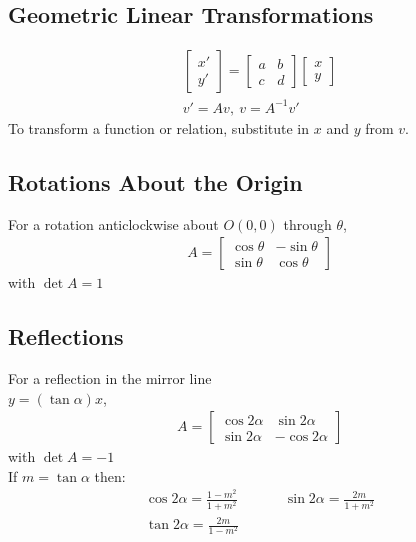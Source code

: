 \documentclass[10pt, a4paper, titlepage]{article}
\begin{document}
\begin{multicols*}{3}
\subsection{Geometric Linear Transformations}
\begin{gather}
	\begin{bmatrix}
		x'\\
		y'
	\end{bmatrix}
	=
	\begin{bmatrix}
		a & b\\
		c & d
	\end{bmatrix}
	\begin{bmatrix}
		x\\
		y
	\end{bmatrix}\\
	v'=Av,\ v=A^{-1}v'
\end{gather}
To transform a function or relation, substitute in $x$ and $y$ from $v$.\\

\dotfill
\subsection{Rotations About the Origin}
For a rotation anticlockwise about $O(0,0)$ through $\theta$,
\begin{align}
	A=
	\begin{bmatrix}
		\cos{\theta} & -\sin{\theta}\\
		\sin{\theta} & \cos{\theta}
	\end{bmatrix}
\end{align}
with $\det{A}=1$\\

\dotfill
\subsection{Reflections}
For a reflection in the mirror line \\$y=(\tan{\alpha})x$,
\begin{align}
	A=
	\begin{bmatrix}
		\cos{2\alpha} & \sin{2\alpha}\\
		\sin{2\alpha} & -\cos{2\alpha}
	\end{bmatrix}
\end{align}
with $\det{A}=-1$\\
If $m=\tan{\alpha}$ then:
\begin{align}
	&\cos{2\alpha}=\frac{1-m^2}{1+m^2}&& &&\sin{2\alpha}=\frac{2m}{1+m^2}&\\
	&\tan{2\alpha}=\frac{2m}{1-m^2}&&	
\end{align}
\dotfill

\end{multicols*}
\end{document}
